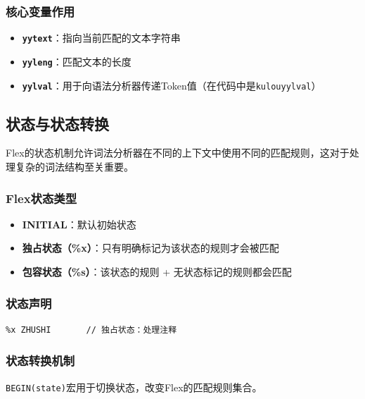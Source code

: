 \documentclass[twocolumn]{article}
\begin{document}
\subsubsection{核心变量作用}
\begin{itemize}
    \item \textbf{\texttt{yytext}}：指向当前匹配的文本字符串
    \item \textbf{\texttt{yyleng}}：匹配文本的长度
    \item \textbf{\texttt{yylval}}：用于向语法分析器传递Token值（在代码中是\texttt{kulouyylval}）
\end{itemize}

\subsection{状态与状态转换}

Flex的状态机制允许词法分析器在不同的上下文中使用不同的匹配规则，这对于处理复杂的词法结构至关重要。

\subsubsection{Flex状态类型}
\begin{itemize}
    \item \textbf{INITIAL}：默认初始状态
    \item \textbf{独占状态（\%x）}：只有明确标记为该状态的规则才会被匹配
    \item \textbf{包容状态（\%s）}：该状态的规则 + 无状态标记的规则都会匹配
\end{itemize}

\subsubsection{状态声明}
\begin{lstlisting}[language=Flex, caption={状态声明}, label=code:state_decl]
%x ZIFUCHUAN    // 独占状态：处理字符串
%x ZHUSHI       // 独占状态：处理注释
\end{lstlisting}

\subsubsection{状态转换机制}
\texttt{BEGIN(state)}宏用于切换状态，改变Flex的匹配规则集合。
\end{document}
